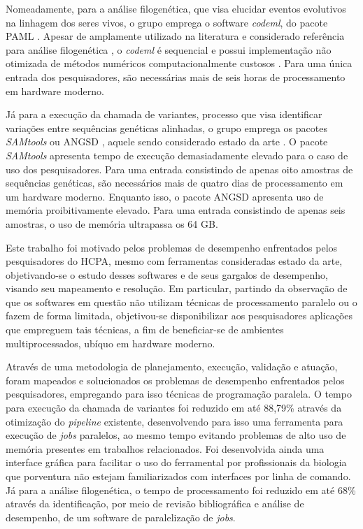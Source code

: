 \documentclass[cic,tc]{iiufrgs}
\begin{document}
Nomeadamente, para a análise filogenética, que visa elucidar eventos evolutivos
na linhagem dos seres vivos, o grupo emprega o software \textit{codeml}, do pacote
PAML \cite{yang2007paml}. Apesar de amplamente utilizado na literatura e
considerado referência para análise filogenética \cite{maldonado2016lmap}, o
\textit{codeml} é sequencial e possui implementação não otimizada de métodos numéricos
computacionalmente custosos \cite{yang2020paml}. Para uma única entrada dos
pesquisadores, são necessárias mais de seis horas de processamento em hardware
moderno.

Já para a execução da chamada de variantes, processo que visa identificar
variações entre sequências genéticas alinhadas, o grupo emprega os pacotes
\textit{SAMtools} \cite{li2009sequence} ou ANGSD \cite{korneliussen2014angsd}, aquele
sendo considerado estado da
arte \cite{poplin2018universal} \cite{yao2020evaluation}. O pacote \textit{SAMtools}
apresenta tempo de execução demasiadamente elevado para o caso de uso dos
pesquisadores. Para uma entrada consistindo de apenas oito amostras de
sequências genéticas, são necessários mais de quatro dias de processamento em
um hardware moderno. Enquanto isso, o pacote ANGSD apresenta uso de memória
proibitivamente elevado. Para uma entrada consistindo de apenas seis amostras,
o uso de memória ultrapassa os 64 GB.

%
%
Este trabalho foi motivado pelos problemas de desempenho enfrentados pelos
pesquisadores do HCPA, mesmo com ferramentas consideradas estado da arte,
objetivando-se o estudo desses softwares e de seus gargalos de
desempenho, visando seu mapeamento e resolução. Em particular, partindo da
observação de que os softwares em questão não utilizam técnicas de
processamento paralelo ou o fazem de forma limitada, objetivou-se
disponibilizar aos pesquisadores aplicações que empreguem tais técnicas, a fim
de beneficiar-se de ambientes multiprocessados, ubíquo em hardware moderno.

%
%
Através de uma metodologia de planejamento, execução, validação e atuação,
foram mapeados e solucionados os problemas de desempenho enfrentados pelos
pesquisadores, empregando para isso técnicas de programação paralela. O tempo
para execução da chamada de variantes foi reduzido em até 88,79\% através da
otimização do \textit{pipeline} existente, desenvolvendo para isso uma
ferramenta para execução de \textit{jobs} paralelos, ao mesmo tempo evitando
problemas de alto uso de memória presentes em trabalhos relacionados. Foi
desenvolvida ainda uma interface gráfica para facilitar o uso do ferramental
por profissionais da biologia que porventura não estejam familiarizados com
interfaces por linha de comando. Já para a análise filogenética, o tempo de
processamento foi reduzido em até 68\% através da identificação, por meio de
revisão bibliográfica e análise de desempenho, de um software de paralelização
de \textit{jobs}.
\end{document}

